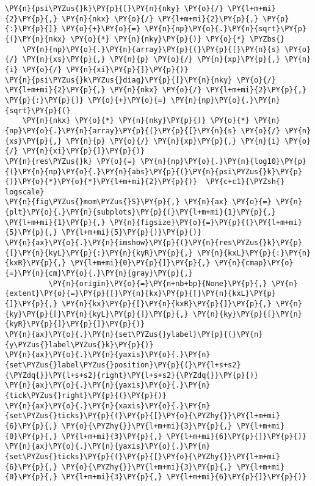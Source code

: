 \begin{Verbatim}[commandchars=\\\{\}]
\PY{n}{psi\PYZus{}k}\PY{p}{[}\PY{n}{nky} \PY{o}{/} \PY{l+m+mi}{2}\PY{p}{,} \PY{n}{nkx} \PY{o}{/} \PY{l+m+mi}{2}\PY{p}{,} \PY{p}{:}\PY{p}{]} \PY{o}{+}\PY{o}{=} \PY{n}{np}\PY{o}{.}\PY{n}{sqrt}\PY{p}{(}\PY{n}{nkx} \PY{o}{*} \PY{n}{nky}\PY{p}{)} \PY{o}{*} \PYZbs{}
    \PY{n}{np}\PY{o}{.}\PY{n}{array}\PY{p}{(}\PY{p}{[}\PY{n}{s} \PY{o}{/} \PY{n}{xs}\PY{p}{,} \PY{n}{p} \PY{o}{/} \PY{n}{xp}\PY{p}{,} \PY{n}{i} \PY{o}{/} \PY{n}{xi}\PY{p}{]}\PY{p}{)}
\PY{n}{psi\PYZus{}k\PYZus{}diag}\PY{p}{[}\PY{n}{nky} \PY{o}{/} \PY{l+m+mi}{2}\PY{p}{,} \PY{n}{nkx} \PY{o}{/} \PY{l+m+mi}{2}\PY{p}{,} \PY{p}{:}\PY{p}{]} \PY{o}{+}\PY{o}{=} \PY{n}{np}\PY{o}{.}\PY{n}{sqrt}\PY{p}{(}
    \PY{n}{nkx} \PY{o}{*} \PY{n}{nky}\PY{p}{)} \PY{o}{*} \PY{n}{np}\PY{o}{.}\PY{n}{array}\PY{p}{(}\PY{p}{[}\PY{n}{s} \PY{o}{/} \PY{n}{xs}\PY{p}{,} \PY{n}{p} \PY{o}{/} \PY{n}{xp}\PY{p}{,} \PY{n}{i} \PY{o}{/} \PY{n}{xi}\PY{p}{]}\PY{p}{)}
\PY{n}{res\PYZus{}k} \PY{o}{=} \PY{n}{np}\PY{o}{.}\PY{n}{log10}\PY{p}{(}\PY{n}{np}\PY{o}{.}\PY{n}{abs}\PY{p}{(}\PY{n}{psi\PYZus{}k}\PY{p}{)}\PY{o}{*}\PY{o}{*}\PY{l+m+mi}{2}\PY{p}{)}  \PY{c+c1}{\PYZsh{} logscale}
\PY{n}{fig\PYZus{}mom\PYZus{}S}\PY{p}{,} \PY{n}{ax} \PY{o}{=} \PY{n}{plt}\PY{o}{.}\PY{n}{subplots}\PY{p}{(}\PY{l+m+mi}{1}\PY{p}{,} \PY{l+m+mi}{1}\PY{p}{,} \PY{n}{figsize}\PY{o}{=}\PY{p}{(}\PY{l+m+mi}{5}\PY{p}{,} \PY{l+m+mi}{5}\PY{p}{)}\PY{p}{)}
\PY{n}{ax}\PY{o}{.}\PY{n}{imshow}\PY{p}{(}\PY{n}{res\PYZus{}k}\PY{p}{[}\PY{n}{kyL}\PY{p}{:}\PY{n}{kyR}\PY{p}{,} \PY{n}{kxL}\PY{p}{:}\PY{n}{kxR}\PY{p}{,} \PY{l+m+mi}{0}\PY{p}{]}\PY{p}{,} \PY{n}{cmap}\PY{o}{=}\PY{n}{cm}\PY{o}{.}\PY{n}{gray}\PY{p}{,}
          \PY{n}{origin}\PY{o}{=}\PY{n+nb+bp}{None}\PY{p}{,} \PY{n}{extent}\PY{o}{=}\PY{p}{[}\PY{n}{kx}\PY{p}{[}\PY{n}{kxL}\PY{p}{]}\PY{p}{,} \PY{n}{kx}\PY{p}{[}\PY{n}{kxR}\PY{p}{]}\PY{p}{,} \PY{n}{ky}\PY{p}{[}\PY{n}{kyL}\PY{p}{]}\PY{p}{,} \PY{n}{ky}\PY{p}{[}\PY{n}{kyR}\PY{p}{]}\PY{p}{]}\PY{p}{)}
\PY{n}{ax}\PY{o}{.}\PY{n}{set\PYZus{}ylabel}\PY{p}{(}\PY{n}{y\PYZus{}label\PYZus{}k}\PY{p}{)}
\PY{n}{ax}\PY{o}{.}\PY{n}{yaxis}\PY{o}{.}\PY{n}{set\PYZus{}label\PYZus{}position}\PY{p}{(}\PY{l+s+s2}{\PYZdq{}}\PY{l+s+s2}{right}\PY{l+s+s2}{\PYZdq{}}\PY{p}{)}
\PY{n}{ax}\PY{o}{.}\PY{n}{yaxis}\PY{o}{.}\PY{n}{tick\PYZus{}right}\PY{p}{(}\PY{p}{)}
\PY{n}{ax}\PY{o}{.}\PY{n}{xaxis}\PY{o}{.}\PY{n}{set\PYZus{}ticks}\PY{p}{(}\PY{p}{[}\PY{o}{\PYZhy{}}\PY{l+m+mi}{6}\PY{p}{,} \PY{o}{\PYZhy{}}\PY{l+m+mi}{3}\PY{p}{,} \PY{l+m+mi}{0}\PY{p}{,} \PY{l+m+mi}{3}\PY{p}{,} \PY{l+m+mi}{6}\PY{p}{]}\PY{p}{)}
\PY{n}{ax}\PY{o}{.}\PY{n}{yaxis}\PY{o}{.}\PY{n}{set\PYZus{}ticks}\PY{p}{(}\PY{p}{[}\PY{o}{\PYZhy{}}\PY{l+m+mi}{6}\PY{p}{,} \PY{o}{\PYZhy{}}\PY{l+m+mi}{3}\PY{p}{,} \PY{l+m+mi}{0}\PY{p}{,} \PY{l+m+mi}{3}\PY{p}{,} \PY{l+m+mi}{6}\PY{p}{]}\PY{p}{)}

\end{Verbatim}
